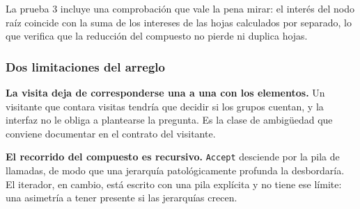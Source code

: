 La prueba 3 incluye una comprobación que vale la pena mirar: el interés del nodo raíz coincide
con la suma de los intereses de las hojas calculados por separado, lo que verifica que la
reducción del compuesto no pierde ni duplica hojas.

\subsubsection*{Dos limitaciones del arreglo}

\textbf{La visita deja de corresponderse una a una con los elementos.} Un visitante que
contara visitas tendría que decidir si los grupos cuentan, y la interfaz no le obliga a
plantearse la pregunta. Es la clase de ambigüedad que conviene documentar en el contrato del
visitante.

\textbf{El recorrido del compuesto es recursivo.} \texttt{Accept} desciende por la pila de
llamadas, de modo que una jerarquía patológicamente profunda la desbordaría. El iterador, en
cambio, está escrito con una pila explícita y no tiene ese límite: una asimetría a tener
presente si las jerarquías crecen.

\fussy
